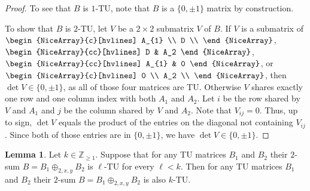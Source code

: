 \documentclass{article}
\theoremstyle{definition}
\newtheorem{lemma}[theorem]{Lemma}
\begin{document}
\begin{proof}
    To see that $B$ is $1$-TU, note that $B$ is a $\{0, \pm 1\}$ matrix by construction.

    To show that $B$ is $2$-TU, let $V$ be a $2 \times 2$ submatrix $V$ of $B$. If $V$ is a submatrix of $\begin{NiceArray}{c}[hvlines] A_{1} \\ D \\ \end{NiceArray}$, $\begin{NiceArray}{cc}[hvlines] D & A_2 \end{NiceArray}$, $\begin{NiceArray}{cc}[hvlines] A_{1} & 0 \end{NiceArray}$, or  $\begin{NiceArray}{c}[hvlines] 0 \\ A_2 \\ \end{NiceArray}$, then $\det V \in \{0, \pm 1\}$, as all of those four matrices are TU. Otherwise $V$ shares exactly one row and one column index with both $A_{1}$ and $A_{2}$. Let $i$ be the row shared by $V$ and $A_{1}$ and $j$ be the column shared by $V$ and $A_{2}$. Note that $V_{ij} = 0$. Thus, up to sign, $\det V$ equals the product of the entries on the diagonal not containing $V_{ij}$. Since both of those entries are in $\{0, \pm 1\}$, we have $\det V \in \{0, \pm 1\}$.
\end{proof}

\begin{lemma}\label{lem:two_sum_k_tu_induction}
    Let $k \in \mathbb{Z}_{\geq 1}$. Suppose that for any TU matrices $B_{1}$ and $B_{2}$ their $2$-sum $B = B_{1} \oplus_{2, x, y} B_{2}$ is $\ell$-TU for every $\ell < k$. Then for any TU matrices $B_{1}$ and $B_{2}$ their $2$-sum $B = B_{1} \oplus_{2, x, y} B_{2}$ is also $k$-TU.
\end{lemma}
\end{document}
